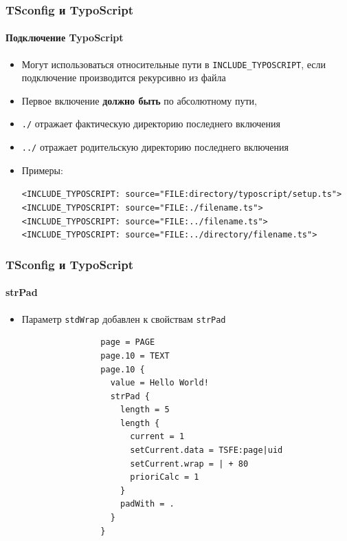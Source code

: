 
\begin{frame}[fragile]
	\frametitle{TSconfig и TypoScript}
	\framesubtitle{Подключение TypoScript}

	\begin{itemize}
		\item Могут использоваться относительные пути в \texttt{INCLUDE\_TYPOSCRIPT},\newline
			если подключение производится рекурсивно из файла
		\item Первое включение \textbf{должно быть} по абсолютному пути,
		\item \texttt{./} отражает фактическую директорию последнего включения
		\item \texttt{../} отражает родительскую директорию последнего включения
		\item Примеры:

			\lstinline!<INCLUDE_TYPOSCRIPT: source="FILE:directory/typoscript/setup.ts">!
			\lstinline!<INCLUDE_TYPOSCRIPT: source="FILE:./filename.ts">!
			\lstinline!<INCLUDE_TYPOSCRIPT: source="FILE:../filename.ts">!
			\lstinline!<INCLUDE_TYPOSCRIPT: source="FILE:../directory/filename.ts">!

	\end{itemize}

\end{frame}


\begin{frame}[fragile]
	\frametitle{TSconfig и TypoScript}
	\framesubtitle{strPad}

	\begin{itemize}
		\item Параметр \texttt{stdWrap} добавлен к свойствам \texttt{strPad}

			\begin{lstlisting}
				page = PAGE
				page.10 = TEXT
				page.10 {
				  value = Hello World!
				  strPad {
				    length = 5
				    length {
				      current = 1
				      setCurrent.data = TSFE:page|uid
				      setCurrent.wrap = | + 80
				      prioriCalc = 1
				    }
				    padWith = .
				  }
				}
			\end{lstlisting}

	\end{itemize}

\end{frame}

